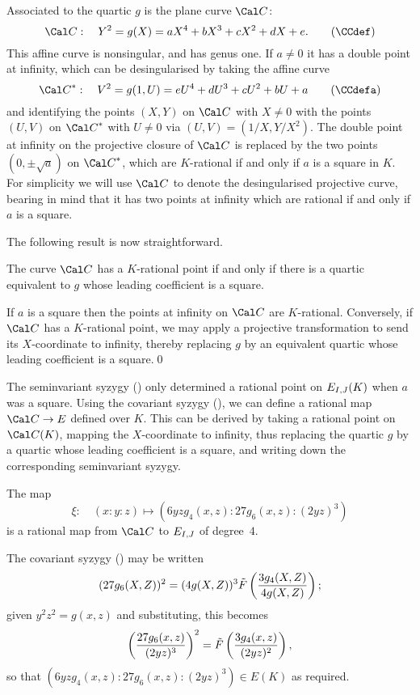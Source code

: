 Associated to the quartic $g$ is the plane curve $\CC$:
\neweq\CCdef
$$ 
    \CC:\quad Y^2 = g(X) = aX^4+bX^3+cX^2+dX+e. \tag\CCdef 
$$ 
This affine curve is nonsingular, and has genus one. If $a\not=0$ it
has a double point at infinity, which can be desingularised by taking
the affine curve\neweq\CCdefa
$$
   \CC^*:\quad V^2 = g(1,U) = eU^4+dU^3+cU^2+bU+a \tag\CCdefa 
$$ 
and identifying the points $(X,Y)$ on $\CC$ with $X\not=0$ with the
points $(U,V)$ on $\CC^*$ with $U\not=0$ via $(U,V)=(1/X,Y/X^2)$.  The
double point at infinity on the projective closure of $\CC$ is
replaced by the two points $(0,\pm\sqrt{a})$ on $\CC^*$, which are
$K$-rational if and only if $a$ is a square in $K$.  For simplicity we
will use $\CC$ to denote the desingularised projective curve, bearing
in mind that it has two points at infinity which are rational if and
only if $a$ is a square.

The following result is now straightforward.
\newprop\ratpt

 The curve $\CC$ has a $K$-rational point
if and only if there is a quartic equivalent to $g$ whose leading
coefficient is a square.
\endproclaim

 If $a$ is a square then the points at infinity on $\CC$
are $K$-rational.  Conversely, if $\CC$ has a $K$-rational point, we
may apply a projective transformation to send its $X$-coordinate to
infinity, thereby replacing $g$ by an equivalent quartic whose leading
coefficient is a square.\qed
\enddemo

The seminvariant syzygy (\semisyz) only determined a rational point on
$E_{I,J}(K)$ when $a$ was a square.  Using the covariant syzygy
(\covarsyz), we can define a rational map $\CC\to E$ defined over
$K$. This can be derived by taking a rational point on $\CC(K)$,
mapping the $X$-coordinate to infinity, thus replacing the quartic $g$
by a quartic whose leading coefficient is a square, and writing down
the corresponding seminvariant syzygy.
\newprop\ratmapprop

 The map 
$$
  \xi:\quad (x:y:z) \mapsto (6yzg_4(x,z) : 27g_6(x,z) : (2yz)^3)
$$
is a rational map from $\CC$ to $E_{I,J}$ of degree~$4$.
\endproclaim

The covariant syzygy (\covarsyz) may be written
$$
   (27g_6(X,Z))^2 = (4g(X,Z))^3 \tilde{F}\left(\frac{3g_4(X,Z)}{4g(X,Z)}\right);
$$
given $y^2z^2 = g(x,z)$ and substituting, this becomes
$$
   \left(\frac{27g_6(x,z)}{(2yz)^3}\right)^2 = 
                   \tilde{F}\left(\frac{3g_4(x,z)}{(2yz)^2}\right), 
$$
so that $(6yzg_4(x,z) : 27g_6(x,z) : (2yz)^3) \in E(K)$ as required.

